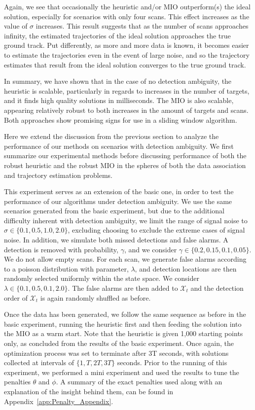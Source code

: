 Again, we see that occasionally the heuristic and/or MIO outperform(s) the ideal solution, especially for scenarios with only four scans. This effect increases as the value of $\sigma$ increases. This result suggests that as the number of scans approaches infinity, the estimated trajectories of the ideal solution approaches the true ground track. Put differently, as more and more data is known, it becomes easier to estimate the trajectories even in the event of large noise, and so the trajectory estimates that result from the ideal solution converges to the true ground track. 

In summary, we have shown that in the case of no detection ambiguity, the heuristic is scalable, particularly in regards to increases in the number of targets, and it finds high quality solutions in milliseconds. The MIO is also scalable, appearing relatively robust to both increases in the amount of targets and scans. Both approaches show promising signs for use in a sliding window algorithm.

Here we extend the discussion from the previous section to analyze the performance of our methods on scenarios with detection ambiguity. We first summarize our experimental methods before discussing performance of both the robust heuristic and the robust MIO in the spheres of both the data association and trajectory estimation problems.

This experiment serves as an extension of the basic one, in order to test the performance of our algorithms under detection ambiguity. We use the same scenarios generated from the basic experiment, but due to the additional difficulty inherent with detection ambiguity, we limit the range of signal noise to $\sigma \in \{0.1,0.5,1.0,2.0\}$, excluding choosing to exclude the extreme cases of signal noise. In addition, we simulate both missed detections and false alarms. A detection is removed with probability, $\gamma$, and we consider $\gamma \in \{0.2,0.15,0.1,0.05\}$. We do not allow empty scans. For each scan, we generate false alarms according to a poisson distribution with parameter, $\lambda$, and detection locations are then randomly selected uniformly within the state space. We consider $\lambda \in \{0.1,0.5,0.1,2.0\}$. The false alarms are then added to $\mathcal{X}_{t}$ and the detection order of $\mathcal{X}_{t}$ is again randomly shuffled as before. 

Once the data has been generated, we follow the same sequence as before in the basic experiment, running the heuristic first and then feeding the solution into the MIO as a warm start. Note that the heuristic is given 1,000 starting points only, as concluded from the results of the basic experiment. Once again, the optimization process was set to terminate after 3T seconds, with solutions collected at intervals of $\{1,T,2T,3T\}$ seconds. Prior to the running of this experiment, we performed a mini experiment and used the results to tune the penalties $\theta$ and $\phi$. A summary of the exact penalties used along with an explanation of the insight behind them, can be found in Appendix~\ref{app:Penalty_Appendix}. 

